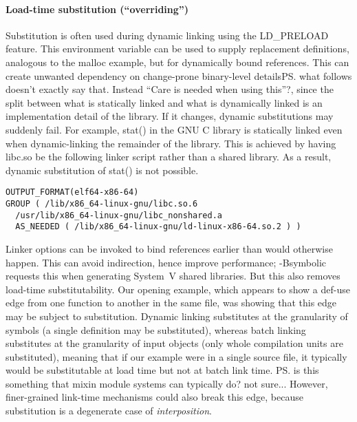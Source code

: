 \paragraph{Load-time substitution (``overriding'')}
Substitution is often used during dynamic linking using the \textsf{LD\_PRELOAD}
feature. This environment variable can be used to supply replacement
definitions, analogous to the \textsf{malloc} example, but for dynamically bound references.
This can create unwanted dependency on change-prone binary-level details\ps{what follows doesn't exactly say
  that. Instead ``Care is needed when using this''?}, 
since the split between what is statically linked and what is dynamically linked
is an implementation detail of the library.
If it changes, dynamic substitutions may suddenly fail.
For example, \textsf{stat()} in the GNU C library is statically linked even when
dynamic-linking the remainder of the library. This is achieved by having \textsf{libc.so} be the following linker script rather than a shared library.
As a result, dynamic substitution of \textsf{stat()} is not possible.

{\scriptsize\begin{lstlisting}[language=plain,basicstyle=\sffamily,columns=flexible]
OUTPUT_FORMAT(elf64-x86-64)
GROUP ( /lib/x86_64-linux-gnu/libc.so.6 
  /usr/lib/x86_64-linux-gnu/libc_nonshared.a
  AS_NEEDED ( /lib/x86_64-linux-gnu/ld-linux-x86-64.so.2 ) )
\end{lstlisting}}

Linker options can be invoked to bind references earlier than would otherwise happen.
This can avoid indirection, hence improve performance; \textsf{-Bsymbolic} 
requests this when generating System~V shared libraries.
But this also removes load-time substitutability.
Our opening example, which appears to show a def-use edge
from one function to another in the same file, 
was showing that this edge may be subject to substitution.
Dynamic linking substitutes at the granularity of symbols
(a single definition may be substituted),
whereas batch linking substitutes at the granularity of input objects
(only whole compilation units are substituted),
meaning that if our example were in a single source file, it typically
would be substitutable at load time but not at batch link time.
\ps{is this something that mixin module systems can typically do? not sure...}
However, finer-grained link-time mechanisms could 
also break this edge, because substitution is a degenerate case of \emph{interposition}.

